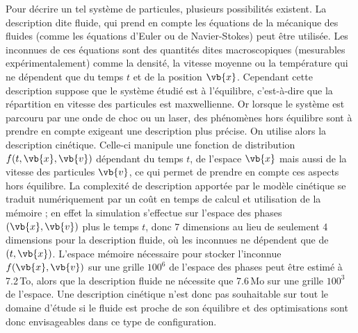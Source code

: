 Pour décrire un tel système de particules, plusieurs possibilités existent. La description dite fluide, qui prend en compte les équations de la mécanique des fluides (comme les équations d’Euler ou de Navier-Stokes) peut être utilisée. Les inconnues de ces équations sont des quantités dites macroscopiques (mesurables expérimentalement) comme la densité, la vitesse moyenne ou la température qui ne dépendent que du temps $t$ et de la position $\vb{x}$. Cependant cette description suppose que le système étudié est à l’équilibre, c’est-à-dire que la répartition en vitesse des particules est maxwellienne. Or lorsque le système est parcouru par une onde de choc ou un laser, des phénomènes hors équilibre sont à prendre en compte exigeant une description plus précise. On utilise alors la description cinétique. Celle-ci manipule une fonction de distribution $f(t,\vb{x},\vb{v})$ dépendant du temps $t$, de l’espace $\vb{x}$ mais aussi de la vitesse des particules $\vb{v}$, ce qui permet de prendre en compte ces aspects hors équilibre. La complexité de description apportée par le modèle cinétique se traduit numériquement par un coût en temps de calcul et utilisation de la mémoire ; en effet la simulation s’effectue sur l'espace des phases $(\vb{x},\vb{v})$ plus le temps $t$, donc 7 dimensions au lieu de seulement 4 dimensions pour la description fluide, où les inconnues ne dépendent que de $(t,\vb{x})$. L’espace mémoire nécessaire pour stocker l'inconnue $f(\vb{x},\vb{v})$ sur une grille $100^6$ de l’espace des phases peut être estimé à 7.2\,To, alors que la description fluide ne nécessite que 7.6\,Mo sur une grille $100^3$ de l’espace. Une description cinétique n’est donc pas souhaitable sur tout le domaine d’étude si le fluide est proche de son équilibre et des optimisations sont donc envisageables dans ce type de configuration.

